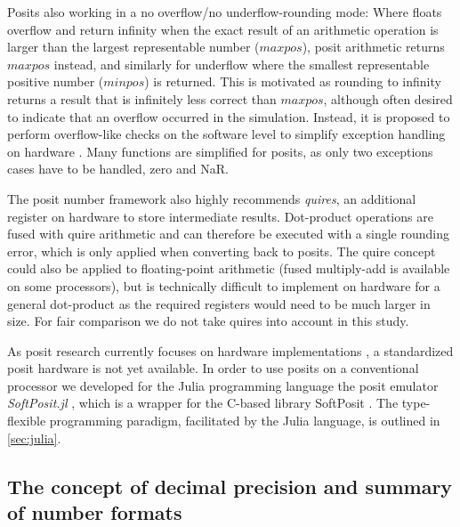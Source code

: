 \documentclass[draft]{agujournal2019}
\begin{document}
Posits also working in a no overflow/no underflow-rounding mode: Where floats overflow and return infinity when the exact result of an arithmetic operation is larger than the largest representable number ($maxpos$), posit arithmetic returns $maxpos$ instead, and similarly for underflow where the smallest representable positive number ($minpos$) is returned. This is motivated as rounding to infinity returns a result that is infinitely less correct than $maxpos$, although often desired to indicate that an overflow occurred in the simulation. Instead, it is proposed to perform overflow-like checks on the software level to simplify exception handling on hardware \cite{Gustafson2017a}. Many functions are simplified for posits, as only two exceptions cases have to be handled, zero and NaR.

The posit number framework also highly recommends \emph{quires}, an additional register on hardware to store intermediate results. Dot-product operations are fused with quire arithmetic and can therefore be executed with a single rounding error, which is only applied when converting back to posits. The quire concept could also be applied to floating-point arithmetic (fused multiply-add is available on some processors), but is technically difficult to implement on hardware for a general dot-product as the required registers would need to be much larger in size. For fair comparison we do not take quires into account in this study.

As posit research currently focuses on hardware implementations \cite{vanDam2019,Chen2018,Chaurasiya2018,Glaser2017}, a standardized posit hardware is not yet available. In order to use posits on a conventional processor we developed for the Julia programming language \cite{Bezanson2017} the posit emulator \emph{SoftPosit.jl} \cite{Klower2019a}, which is a wrapper for the C-based library SoftPosit \cite{Leong2020}. The type-flexible programming paradigm, facilitated by the Julia language, is outlined in \ref{sec:julia}.

\subsection{The concept of decimal precision and summary of number formats}
\label{sec:decprec}
\end{document}

